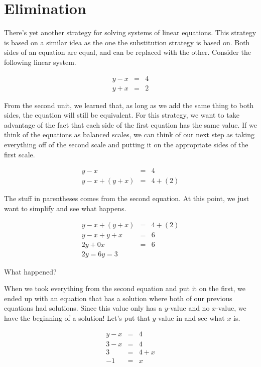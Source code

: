 \section{Elimination}

There's yet another strategy for solving systems of linear equations.  This strategy is based on a similar idea as the one the substitution strategy is based on.  Both sides of an equation are equal, and can be replaced with the other.  Consider the following linear system.

$$\begin{array}{rcl}
y - x & = & 4 \\
y + x & = & 2\end{array}$$

From the second unit, we learned that, as long as we add the same thing to both sides, the equation will still be equivalent.  For this strategy, we want to take advantage of the fact that each side of the first equation has the same value.  If we think of the equations as balanced scales, we can think of our next step as taking everything off of the second scale and putting it on the appropriate sides of the first scale.

$$\begin{array}{rcl}
y - x & = & 4 \\
y - x + (y + x) & = & 4 + (2)
\end{array}$$

The stuff in parentheses comes from the second equation.  At this point, we just want to simplify and see what happens.

$$\begin{array}{rcl}
y - x + (y + x) & = & 4 + (2)\\
y - x + y + x & = & 6\\
2y + 0x & = & 6\\
2y = 6
y = 3 \end{array}$$

What happened?

When we took everything from the second equation and put it on the first, we ended up with an equation that has a solution where both of our previous equations had solutions.  Since this value only has a $y$-value and no $x$-value, we have the beginning of a solution!  Let's put that $y$-value in and see what $x$ is.

$$
\begin{array}{rcl}
y - x & = & 4 \\
3 - x & = & 4 \\
3 & = & 4 + x \\
-1 & = & x \end{array}$$

